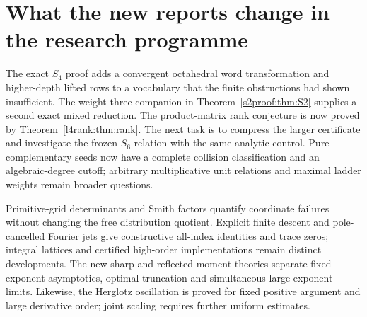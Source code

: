 \section{What the new reports change in the research programme}
The exact $S_4$ proof adds a convergent octahedral word transformation and
higher-depth lifted rows to a vocabulary that the finite obstructions had
shown insufficient. The weight-three companion in Theorem~\ref{s2proof:thm:S2} supplies a
second exact mixed reduction. The product-matrix rank conjecture is now
proved by Theorem~\ref{l4rank:thm:rank}. The next task is to compress the
larger certificate and
investigate the frozen $S_6$ relation with the same analytic control.
Pure complementary seeds now have a complete collision classification and
an algebraic-degree cutoff; arbitrary multiplicative unit relations and
maximal ladder weights remain broader questions.

Primitive-grid determinants and Smith factors quantify coordinate failures
without changing the free distribution quotient. Explicit finite descent
and pole-cancelled Fourier jets give constructive all-index identities and
trace zeros; integral lattices and certified high-order implementations
remain distinct developments. The new sharp and reflected moment theories
separate fixed-exponent asymptotics, optimal truncation and simultaneous
large-exponent limits. Likewise, the Herglotz oscillation is proved for fixed
positive argument and large derivative order; joint scaling requires further
uniform estimates.

